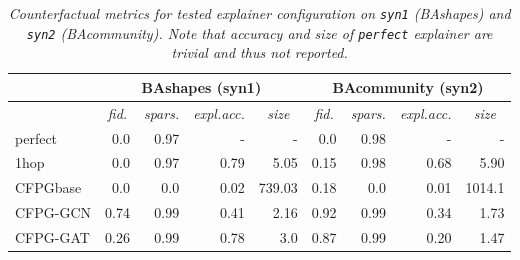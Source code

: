 \documentclass[binding=0.6cm]{sapthesis}
\begin{document}
\begin{table}
    \centering
    \begin{tabular}{lrrrrrrrr}
        \hline
            & \multicolumn{4}{c}{BAshapes (syn1)} & \multicolumn{4}{c}{BAcommunity (syn2)} \\ 
        \hline
         &
          \multicolumn{1}{|c}{\textit{fid.}} & \multicolumn{1}{c}{\textit{spars.}} & \multicolumn{1}{c}{\textit{expl.acc.}} & \multicolumn{1}{c|}{\textit{size}} & 
          \multicolumn{1}{c}{\textit{fid.}} & \multicolumn{1}{c}{\textit{spars.}} & \multicolumn{1}{c}{\textit{expl.acc.}} & \multicolumn{1}{c}{\textit{size}} \\ 
        \hline
        perfect  & 0.0    & 0.97   & -       & -        & 0.0      & 0.98    & -       & -      \\
        1hop     & 0.0    & 0.97   & 0.79    & 5.05     & 0.15     & 0.98    & 0.68    & 5.90   \\
        \hline
        CFPGbase & 0.0    & 0.0    & 0.02    & 739.03   & 0.18     & 0.0     & 0.01    & 1014.1 \\
        CFPG-GCN & 0.74   & 0.99   & 0.41    & 2.16     & 0.92     & 0.99    & 0.34    & 1.73   \\
        CFPG-GAT & 0.26   & 0.99   & 0.78    & 3.0      & 0.87     & 0.99    & 0.20    & 1.47   \\
        \hline
    \end{tabular}
    \caption{\textit{Counterfactual metrics for tested explainer configuration on \texttt{syn1} (BAshapes) and \texttt{syn2} (BAcommunity). Note that accuracy and size of \texttt{perfect} explainer are trivial and thus not reported.}}
    \label{tab:expRes.syn1-2}
\end{table}
\end{document}
